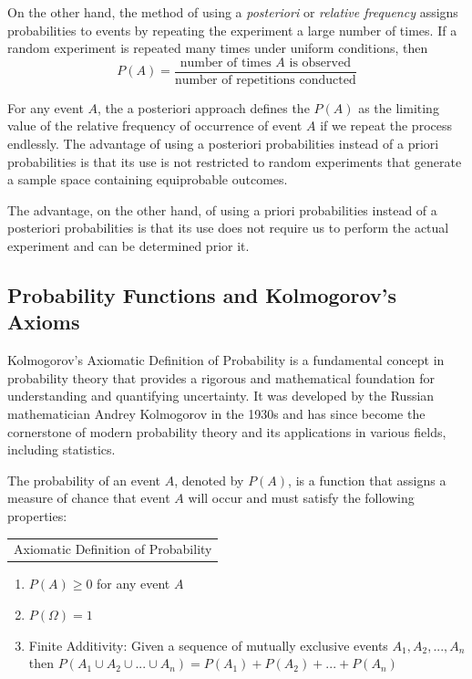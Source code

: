 \documentclass{article}
\begin{document}
On the other hand, the method of using a \emph{posteriori} or \emph{relative frequency} assigns probabilities to events by repeating the experiment a large number of times. If a random experiment is repeated many times under uniform conditions, then
$$
P(A)=\frac{\text{number of times } A \text{ is observed}}{\text{number of repetitions conducted}}
$$

For any event $A$, the a posteriori approach defines the $P(A)$ as the limiting value of the relative frequency of occurrence of event $A$ if we repeat the process endlessly. The advantage of using a posteriori probabilities instead of a priori probabilities is that its use is not restricted to random experiments that generate a sample space containing equiprobable outcomes.

The advantage, on the other hand, of using a priori probabilities instead of a posteriori probabilities is that its use does not require us to perform the actual experiment and can be determined prior it.

\subsection{Probability Functions and Kolmogorov's Axioms}

Kolmogorov's Axiomatic Definition of Probability is a fundamental concept in probability theory that provides a rigorous and mathematical foundation for understanding and quantifying uncertainty. It was developed by the Russian mathematician Andrey Kolmogorov in the 1930s and has since become the cornerstone of modern probability theory and its applications in various fields, including statistics.

The probability of an event $A$, denoted by $P(A)$, is a function that assigns a measure of chance that event $A$ will occur and must satisfy the following properties:

\begin{margintable}
\begin{tabular}{c} 
    Axiomatic Definition of Probability
\end{tabular}
\end{margintable}

\begin{enumerate}
\item $P(A) \geq $0 for any event $A$
\item $P(\Omega) = 1$
\item Finite Additivity: Given a sequence of mutually exclusive events $A_1, A_2, ..., A_n$ then $P(A_1 \cup A_2 \cup ... \cup A_n) = P(A_1) + P(A_2) + ... + P(A_n)$
\end{enumerate}
\end{document}

